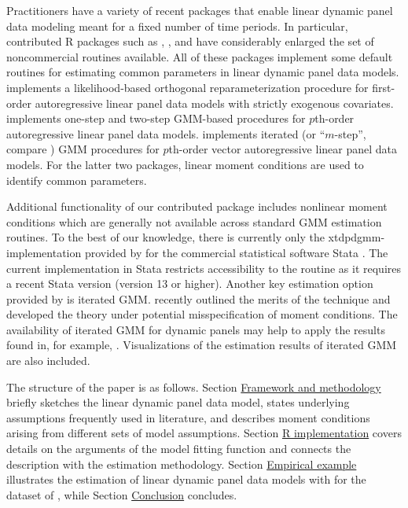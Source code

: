 Practitioners have a variety of recent packages that enable linear dynamic panel data modeling meant for a fixed number of time periods. In particular, contributed R packages such as  \citep{pickup2017orthopanels},  \citep{CroMil2019plm}, and  \citep{SigFer2019panelvar} have considerably enlarged the set of noncommercial routines available. All of these packages implement some default routines for estimating common parameters in linear dynamic panel data models.  implements a likelihood-based orthogonal reparameterization procedure for first-order autoregressive linear panel data models with strictly exogenous covariates.  implements one-step and two-step GMM-based procedures for $p$th-order autoregressive linear panel data models.  implements iterated  (or ``$m$-step'', compare \citealp{SigFer2019panelvar}) GMM  procedures for $p$th-order vector autoregressive linear panel data models. For the latter two packages, linear moment conditions are used to identify common parameters.

Additional functionality of our contributed package  includes nonlinear moment conditions which are generally not available across standard GMM estimation routines. To the best of our knowledge, there is currently only the xtdpdgmm-implementation provided by \citep{Kri2019} for the commercial statistical software Stata \citep{Sta2015}. The current implementation in Stata restricts accessibility to the routine as it requires a recent Stata version (version 13 or higher).
Another key estimation option provided by  is iterated GMM. \citet{HansenLee2020} recently outlined the merits of the technique and developed the theory under potential misspecification of moment conditions.
The availability of iterated GMM for dynamic panels may help to apply the results found in, for example, \citet{HWANG2018381}. Visualizations of the estimation results of iterated GMM are also included.

The structure of the paper is as follows. Section \hyperref[sec:ldpdm]{Framework and methodology} briefly sketches the linear dynamic panel data model, states underlying assumptions frequently used in literature, and describes moment conditions arising from different sets of model assumptions. Section \hyperref[Sec:R]{R implementation} covers details on the arguments of the model fitting function  and connects the description with the estimation methodology.
Section \hyperref[sec:example]{Empirical example} illustrates the estimation of linear dynamic panel data models with  for the dataset of \citet{AreBon1991}, while Section \hyperref[sec:conclusion]{Conclusion} concludes.















